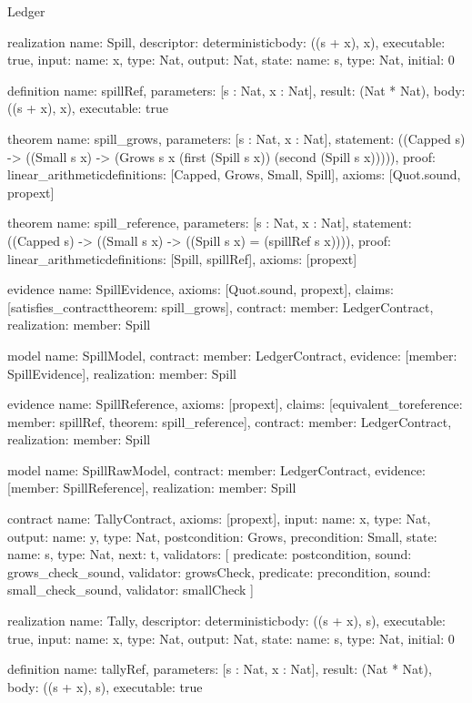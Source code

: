\begin{lexlean}{Ledger}
\begin{semanticmodule}
realization{
  name: Spill,
  descriptor: deterministic{body: ((s + x), x)},
  executable: true,
  input: {name: x, type: Nat},
  output: Nat,
  state: {name: s, type: Nat, initial: 0}
}

definition{
  name: spillRef,
  parameters: [s : Nat, x : Nat],
  result: (Nat * Nat),
  body: ((s + x), x),
  executable: true
}

theorem{
  name: spill_grows,
  parameters: [s : Nat, x : Nat],
  statement: ((Capped s) -> ((Small s x) -> (Grows s x (first (Spill s x)) (second (Spill s x))))),
  proof: linear_arithmetic{definitions: [Capped, Grows, Small, Spill]},
  axioms: [Quot.sound, propext]
}

theorem{
  name: spill_reference,
  parameters: [s : Nat, x : Nat],
  statement: ((Capped s) -> ((Small s x) -> ((Spill s x) = (spillRef s x)))),
  proof: linear_arithmetic{definitions: [Spill, spillRef]},
  axioms: [propext]
}

evidence{
  name: SpillEvidence,
  axioms: [Quot.sound, propext],
  claims: [satisfies_contract{theorem: spill_grows}],
  contract: {member: LedgerContract},
  realization: {member: Spill}
}

model{
  name: SpillModel,
  contract: {member: LedgerContract},
  evidence: [{member: SpillEvidence}],
  realization: {member: Spill}
}

evidence{
  name: SpillReference,
  axioms: [propext],
  claims: [equivalent_to{reference: {member: spillRef}, theorem: spill_reference}],
  contract: {member: LedgerContract},
  realization: {member: Spill}
}

model{
  name: SpillRawModel,
  contract: {member: LedgerContract},
  evidence: [{member: SpillReference}],
  realization: {member: Spill}
}

contract{
  name: TallyContract,
  axioms: [propext],
  input: {name: x, type: Nat},
  output: {name: y, type: Nat},
  postcondition: Grows,
  precondition: Small,
  state: {name: s, type: Nat, next: t},
  validators: [
    {predicate: postcondition, sound: grows_check_sound, validator: growsCheck},
    {predicate: precondition, sound: small_check_sound, validator: smallCheck}
  ]
}

realization{
  name: Tally,
  descriptor: deterministic{body: ((s + x), s)},
  executable: true,
  input: {name: x, type: Nat},
  output: Nat,
  state: {name: s, type: Nat, initial: 0}
}

definition{
  name: tallyRef,
  parameters: [s : Nat, x : Nat],
  result: (Nat * Nat),
  body: ((s + x), s),
  executable: true
}


\end{semanticmodule}
\end{lexlean}

